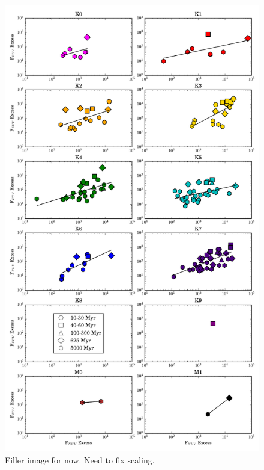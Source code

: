 \documentclass[twocolumn]{aastex62}
\begin{document}
\begin{figure}[t]
\centering
\includegraphics[height=0.7\textheight]{nuv_vs_fuv_10_NO_J_Kspt.pdf}
\caption{Filler image for now. Need to fix scaling. \label{fig:nuv_vs_fuv}}
\end{figure}
\end{document}
